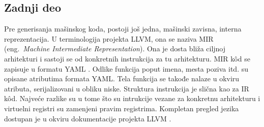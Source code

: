 \documentclass[12pt,oneside]{memoir}
\begin{document}
\subsection{Zadnji deo}


Pre generisanja mašinskog koda, postoji još jedna, mašinski zavisna, interna reprezentacija.
U terminologija projekta LLVM, ona se naziva MIR (eng.~{\em Machine Intermediate Representation}).
Ona je dosta bliža ciljnoj arhitekturi i sastoji se od konkretnih instrukcija za tu arhitekturu.
MIR k\^od se zapisuje u formatu YAML \cite{yaml}.
Odlike funkcija poput imena, mesta poziva itd. su opisane atributima formata YAML.
Tela funkcija se takođe nalaze u okviru atributa, serijalizovani u obliku niske.
Struktura instrukcija je slična kao za IR k\^od.
Najveće razlike su u tome što su intrukcije vezane za konkretnu arhitekturu i virtuelni registri su zamenjeni pravim registrima.
Kompletan pregled jezika dostupan je u okviru dokumentacije projekta LLVM \cite{mirlangref}.
\end{document}
